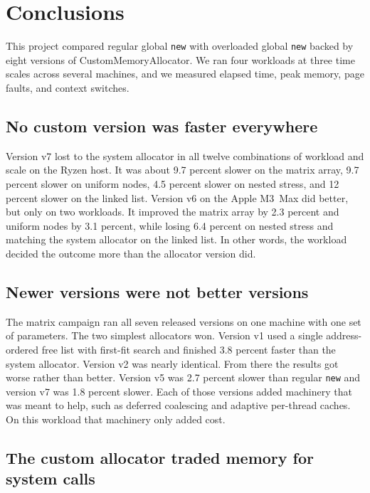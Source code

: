 \section{Conclusions}
\label{sec:conclusions}

This project compared regular global \texttt{new} with overloaded global
\texttt{new} backed by eight versions of CustomMemoryAllocator.
We ran four workloads at three time scales across several machines, and we
measured elapsed time, peak memory, page faults, and context switches.

\subsection{No custom version was faster everywhere}

Version v7 lost to the system allocator in all twelve combinations of workload
and scale on the Ryzen host.
It was about 9.7 percent slower on the matrix array, 9.7 percent slower on
uniform nodes, 4.5 percent slower on nested stress, and 12 percent slower on
the linked list.
Version v6 on the Apple M3~Max did better, but only on two workloads.
It improved the matrix array by 2.3 percent and uniform nodes by 3.1 percent,
while losing 6.4 percent on nested stress and matching the system allocator on
the linked list.
In other words, the workload decided the outcome more than the allocator
version did.

\subsection{Newer versions were not better versions}

The matrix campaign ran all seven released versions on one machine with one set
of parameters.
The two simplest allocators won.
Version v1 used a single address-ordered free list with first-fit search and
finished 3.8 percent faster than the system allocator.
Version v2 was nearly identical.
From there the results got worse rather than better.
Version v5 was 2.7 percent slower than regular \texttt{new} and version v7 was
1.8 percent slower.
Each of those versions added machinery that was meant to help, such as
deferred coalescing and adaptive per-thread caches.
On this workload that machinery only added cost.

\subsection{The custom allocator traded memory for system calls}

